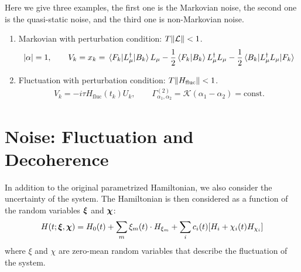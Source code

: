 \documentclass{notes2}
\begin{document}
\begin{example}
    Here we give three examples, the first one is the Markovian noise, the second one is the quasi-static noise, and the third one is non-Markovian noise. 
    \begin{enumerate}
    \item Markovian with perturbation condition: $T\norm{\mathcal{L}} < 1$.
    \begin{align*}
        \abs{\alpha} =1, \qquad
        V_k = x_k = \mel{F_k}{L_\mu^\dagger}{B_k}L_\mu -\frac{1}{2}\braket{F_k}{B_k}L_\mu^\dagger L_\mu - \frac{1}{2}\mel{B_k}{L_\mu^\dagger L_\mu}{F_k}
    \end{align*}
    \item Fluctuation with perturbation condition: $T\norm{H_{\text{fluc}}} < 1$.
    \begin{align*}
        V_k = -i\tau H_{\text{fluc}}(t_k)U_k, \qquad \Gamma^{(2)}_{\alpha_1,\alpha_2} = \mathcal{K}(\alpha_1 - \alpha_2) = \text{const.} 
    \end{align*}
    \end{enumerate}

\end{example}
\section{Noise: Fluctuation and Decoherence}
In addition to the original parametrized Hamiltonian, we also consider the uncertainty of the system. The Hamiltonian is then considered as a function of the random variables $\vb*\xi$ and $\vb*\chi$:
\begin{equation}
    H(t; \vb* \xi, \vb* \chi) = H_0(t) + \sum_m \xi_m(t) \cdot H_{\xi_m}+ \sum_{i} c_i(t) [H_i + \chi_i(t) H_{\chi_i}]
    \label{eq:total_hamiltonian}
\end{equation}
where $\xi$ and $\chi$ are zero-mean random variables that describe the fluctuation of the system.
\end{document}
